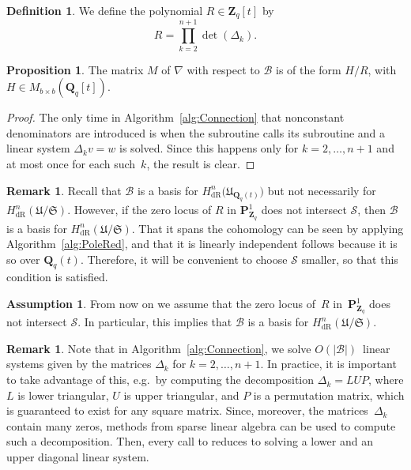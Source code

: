 \documentclass[a4paper,11pt]{article}
\numberwithin{equation}{section}
\providecommand{\card}[1]{\lvert#1\rvert}                %
\newcommand{\ZZ}{\mathbf{Z}} %
\newcommand{\QQ}{\mathbf{Q}} %
\providecommand{\HdR}{H_{\text{dR}}}    %
\providecommand{\cB}{\mathcal{B}} %
\providecommand{\BigOh}{O}          %
\theoremstyle{definition}
\newtheorem{prop}[thm]{Proposition}
\newtheorem{defn}[thm]{Definition}
\newtheorem{rem}[thm]{Remark}
\newtheorem{assump}[thm]{Assumption}
\begin{document}
\begin{defn} \label{defn:resultant}
We define the polynomial $R \in \ZZ_q[t]$ by
\[
R = \prod_{k=2}^{n+1}  \det(\Delta_k).
\]
\end{defn}

\begin{prop} \label{thm:denom}
The matrix $M$ of $\nabla$ with respect to $\cB$ is of the form
$H/R$, with $H \in M_{b \times b}(\QQ_q[t])$.
\end{prop}

\begin{proof}
The only time in Algorithm~\ref{alg:Connection} that nonconstant denominators 
are introduced is when the subroutine {} calls its subroutine 
{} and a linear system $\Delta_k v = w$ is solved. Since this 
happens only for $k=2, \dotsc, n+1$ and at most once for each 
such~$k$, the result is clear.
\end{proof}

\begin{rem}
Recall that $\cB$ is a basis for $\HdR^n\bigl(\mathfrak{U}_{\QQ_q(t)}\bigr)$ 
but not necessarily for $\HdR^n(\mathfrak{U}/\mathfrak{S})$. However, if the 
zero locus of $R$ in $\mathbf{P}^1_{\ZZ_q}$ does not intersect $\mathcal{S}$, 
then $\cB$ is a basis for $\HdR^n(\mathfrak{U}/\mathfrak{S})$. That it 
spans the cohomology can be seen by applying Algorithm~\ref{alg:PoleRed}, and that it 
is linearly independent follows because it is so over $\QQ_q(t)$. Therefore, it will 
be convenient to choose $\mathcal{S}$ smaller, so that this condition is satisfied. 
\end{rem}

\begin{assump} \label{assump:R}
From now on we assume that the zero locus of~$R$ in~$\mathbf{P}^1_{\ZZ_q}$ 
does not intersect $\mathcal{S}$. In particular, this implies that $\cB$ is 
a basis for $\HdR^n(\mathfrak{U}/\mathfrak{S})$.
\end{assump}

\begin{rem}
Note that in Algorithm~\ref{alg:Connection}, we solve $\BigOh(\card{\cB})$~linear 
systems given by the matrices $\Delta_k$ for $k = 2, \dotsc, n+1$.  In practice, 
it is important to take advantage of this, e.g.\ by computing the decomposition 
$\Delta_k = LUP$, where $L$ is lower triangular, $U$ is upper triangular, and 
$P$ is a permutation matrix, which is guaranteed to exist for any square matrix. 
Since, moreover, the matrices~$\Delta_k$ contain many zeros, methods from sparse 
linear algebra can be used to compute such a decomposition.  Then, every call to 
{} reduces to solving a lower and an upper diagonal linear system.
\end{rem}
\end{document}
